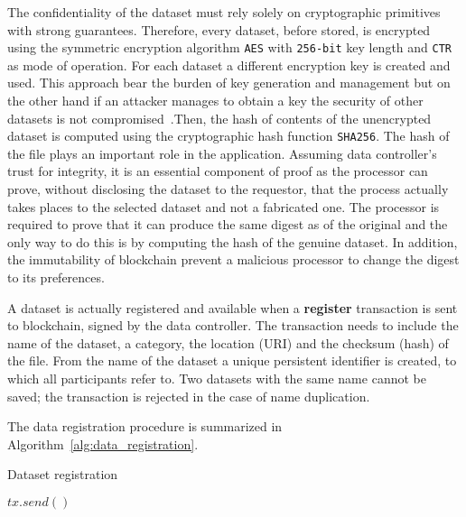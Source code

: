 The confidentiality of the dataset must rely solely on cryptographic primitives with strong guarantees. Therefore, every dataset, before stored, is encrypted using the symmetric encryption algorithm \verb|AES| with \verb|256-bit| key length and \verb|CTR| as mode of operation. For each dataset a different encryption key is created and used. This approach bear the burden of key generation and management but on the other hand if an attacker manages to obtain a key the security of other datasets is not compromised~\cite{schneier1997improved}.Then, the hash of contents of the unencrypted dataset is computed using the cryptographic hash function \verb|SHA256|. The hash of the file plays an important role in the application. Assuming data controller's trust for integrity, it is an essential component of proof as the processor can prove, without disclosing the dataset to the requestor, that the process actually takes places to the selected dataset and not a fabricated one. The processor is required to prove that it can produce the same digest as of the original and the only way to do this is by computing the hash of the genuine dataset. In addition, the immutability of blockchain prevent a malicious processor to change the digest to its preferences.

A dataset is actually registered and available when a \textbf{register} transaction is sent to blockchain, signed by the data controller. The transaction needs to include the name of the dataset, a category, the location (URI) and the checksum (hash) of the file. From the name of the dataset a unique persistent identifier is created, to which all participants refer to. Two datasets with the same name cannot be saved; the transaction is rejected in the case of name duplication.

The data registration procedure is summarized in Algorithm~\ref{alg:data_registration}.

\begin{algorithm}[!htb]
  \caption{Dataset registration}\label{alg:data_registration}
  \begin{algorithmic}[1]
      \State {}
  \EndFunction

        \State $tx.send()$
        \State {}
  \EndFunction
    \State {}
  \EndProcedure
  \end{algorithmic}
\end{algorithm}

